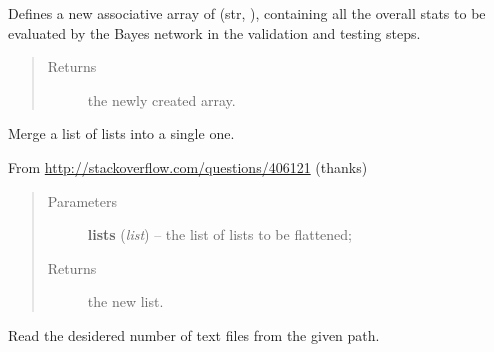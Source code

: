 \documentclass[letterpaper,10pt,english]{sphinxmanual}
\begin{document}
\begin{fulllineitems}
\begin{fulllineitems}
\end{fulllineitems}


\begin{fulllineitems}
\label{index:utils.Utils.create_test_stats}
Defines a new associative array of (str, ),
containing all the overall stats to be evaluated by the Bayes network
in the validation and testing steps.
\begin{quote}\begin{description}
\item[{Returns}] \leavevmode
the newly created array.

\end{description}\end{quote}

\end{fulllineitems}


\begin{fulllineitems}
\label{index:utils.Utils.merge_lists}
Merge a list of lists into a single one.

From \href{http://stackoverflow.com/questions/406121}{http://stackoverflow.com/questions/406121} (thanks)
\begin{quote}\begin{description}
\item[{Parameters}] \leavevmode
\textbf{lists} (\emph{list}) -- the list of lists to be flattened;

\item[{Returns}] \leavevmode
the new list.

\end{description}\end{quote}

\end{fulllineitems}


\begin{fulllineitems}
\label{index:utils.Utils.read_mails}
Read the desidered number of text files from the given path.


\end{fulllineitems}
\end{fulllineitems}
\end{document}

